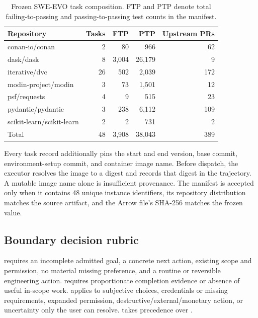 \begin{table}[t]
  \caption{Frozen SWE-EVO task composition. FTP and PTP denote total failing-to-passing and passing-to-passing test counts in the manifest.}
  \label{tab:dataset-composition}
  \centering
  \begin{tabular}{lrrrr}
    \toprule
    Repository & Tasks & FTP & PTP & Upstream PRs \\
    \midrule
    conan-io/conan & 2 & 80 & 966 & 62 \\
    dask/dask & 8 & 3,004 & 26,179 & 9 \\
    iterative/dvc & 26 & 502 & 2,039 & 172 \\
    modin-project/modin & 3 & 73 & 1,501 & 12 \\
    psf/requests & 4 & 9 & 515 & 23 \\
    pydantic/pydantic & 3 & 238 & 6,112 & 109 \\
    scikit-learn/scikit-learn & 2 & 2 & 731 & 2 \\
    \midrule
    Total & 48 & 3,908 & 38,043 & 389 \\
    \bottomrule
  \end{tabular}
\end{table}

Every task record additionally pins the start and end version, base commit, environment-setup commit, and container image name. Before dispatch, the executor resolves the image to a digest and records that digest in the trajectory. A mutable image name alone is insufficient provenance. The manifest is accepted only when it contains 48 unique instance identifiers, its repository distribution matches the source artifact, and the Arrow file's SHA-256 matches the frozen value.

\subsection{Boundary decision rubric}

\continueaction{} requires an incomplete admitted goal, a concrete next action, existing scope and permission, no material missing preference, and a routine or reversible engineering action. \stopaction{} requires proportionate completion evidence or absence of useful in-scope work.  applies to subjective choices, credentials or missing requirements, expanded permission, destructive/external/monetary action, or uncertainty only the user can resolve.  takes precedence over \continueaction.


